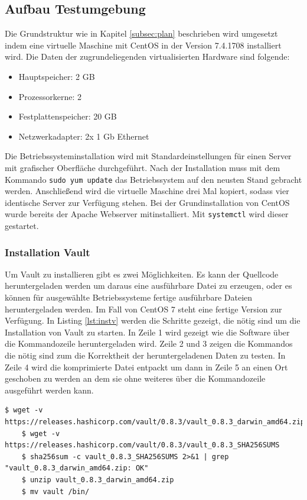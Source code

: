 \documentclass[
book,
a4paper,   
titlepage,  
halfparskip,
12pt        
]{scrartcl}
\newcommand\inline{\lstinline[basicstyle=\ttfamily]}
\begin{document}
\begin{onehalfspacing}
\subsection{Aufbau Testumgebung}
Die Grundstruktur wie in Kapitel \vref{subsec:plan} beschrieben wird umgesetzt indem eine virtuelle Maschine mit CentOS in der Version 7.4.1708 installiert wird. Die Daten der zugrundeliegenden virtualisierten Hardware sind folgende:
\begin{itemize}
	\item Hauptspeicher: 2 GB
	\item Prozessorkerne: 2
	\item Festplattenspeicher: 20 GB
	\item Netzwerkadapter: 2x 1 Gb Ethernet
\end{itemize} 
Die Betriebssysteminstallation wird mit Standardeinstellungen für einen Server mit grafischer Oberfläche durchgeführt. Nach der Installation muss mit dem Kommando \inline|sudo yum update| das Betriebssystem auf den neusten Stand gebracht werden. Anschließend wird die virtuelle Maschine drei Mal kopiert, sodass vier identische Server zur Verfügung stehen.\newline
Bei der Grundinstallation von CentOS wurde bereits der Apache Webserver mitinstalliert. Mit \inline|systemctl| wird dieser gestartet.
\subsubsection{Installation Vault}
\label{subsubsec:instv}
Um Vault zu installieren gibt es zwei Möglichkeiten. Es kann der Quellcode heruntergeladen werden um daraus eine ausführbare Datei zu erzeugen, oder es können für ausgewählte Betriebssysteme fertige ausführbare Dateien heruntergeladen werden. Im Fall von CentOS 7 steht eine fertige Version zur Verfügung. In Listing \vref{lst:instv} werden die Schritte gezeigt, die nötig sind um die Installation von Vault zu starten. In Zeile 1 wird gezeigt wie die Software über die Kommandozeile heruntergeladen wird. Zeile 2 und 3 zeigen die Kommandos die nötig sind zum die Korrektheit der heruntergeladenen Daten zu testen. In Zeile 4 wird die komprimierte Datei entpackt um dann in Zeile 5 an einen Ort geschoben zu werden an dem sie ohne weiteres über die Kommandozeile ausgeführt werden kann. 

\begin{lstlisting}[caption={[Installation Vault] Schritte die zur Installation von Vault notwendig sind}, label=lst:instv, captionpos=b, basicstyle=\ttfamily]
	$ wget -v https://releases.hashicorp.com/vault/0.8.3/vault_0.8.3_darwin_amd64.zip
	$ wget -v https://releases.hashicorp.com/vault/0.8.3/vault_0.8.3_SHA256SUMS
	$ sha256sum -c vault_0.8.3_SHA256SUMS 2>&1 | grep "vault_0.8.3_darwin_amd64.zip: OK"
	$ unzip vault_0.8.3_darwin_amd64.zip
	$ mv vault /bin/
\end{lstlisting}


\end{onehalfspacing}
\end{document}
